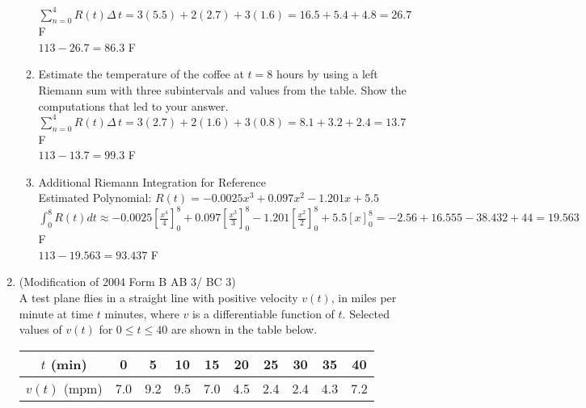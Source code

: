 \documentclass[10pt, letterpaper]{report}
\begin{document}
\begin{enumerate}
\begin{enumerate}
        $\sum_{n=0}^{4}R(t)\Delta\,t=
        3(5.5)+2(2.7)+3(1.6)=
        16.5+5.4+4.8=26.7$\degree F \\

        $113-26.7=86.3$ \degree F \\

      \item{Estimate the temperature of the coffee at $t=8$ hours by using a left Riemann sum with three subintervals and values from the table. Show the computations that led to your answer.} \\

        $\sum_{n=0}^{4}R(t)\Delta\,t=
        3(2.7)+2(1.6)+3(0.8)=
        8.1+3.2+2.4=13.7$\degree F \\

        $113-13.7=99.3$ \degree F \\

      \item{Additional Riemann Integration for Reference} \\

        Estimated Polynomial: $R(t)=-0.0025x^{3}+0.097x^{2}-1.201x+5.5$ \\

        $\int_{0}^{8}R(t)dt\approx
        -0.0025[\frac{x^{4}}{4}]_{0}^{8}+0.097[\frac{x^{3}}{3}]_{0}^{8}-1.201[\frac{x^{2}}{2}]_{0}^{8}+5.5[x]_{0}^{8}=
        -2.56+16.555-38.432+44=19.563$\degree F \\

        $113-19.563=93.437$ \degree F \\
\hline
    \end{enumerate}
  \item{(Modification of 2004 Form B AB 3/ BC 3) \\
  A test plane flies in a straight line with positive velocity $v(t)$, in miles per minute at time $t$ minutes, where $v$ is a differentiable function of $t$. Selected values of $v(t)$ for $0\leq t\leq 40$ are shown in the table below.
    \begin{center}
      \begin{tabular}{| c | c | c | c | c | c | c | c | c | c |}
        \hline
        $t$ (min) & 0 & 5 & 10 & 15 & 20 & 25 & 30 & 35 & 40 \\
        \hline
        $v(t)$ (mpm) & 7.0 & 9.2 & 9.5 & 7.0 & 4.5 & 2.4 & 2.4 & 4.3 & 7.2 \\
        \hline
      \end{tabular}
    \end{center}}


\end{enumerate}
\end{document}
